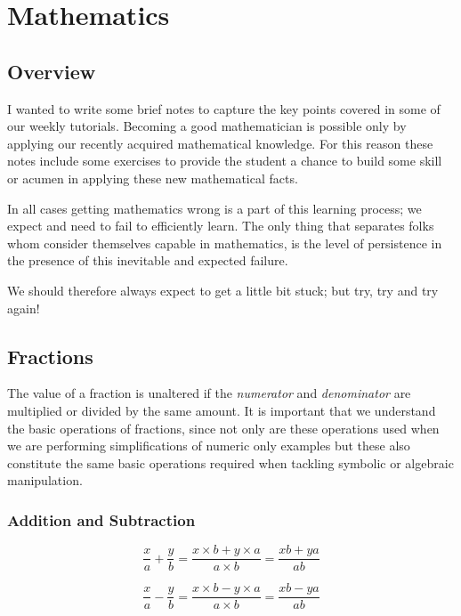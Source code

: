 \chapter{Mathematics}
\label{ch:intro}

\section{Overview}

I wanted to write some brief notes to capture the key points covered in some of our weekly tutorials. Becoming a good mathematician is possible only by applying our recently acquired mathematical knowledge. For this reason these notes include some exercises to provide the student a chance to build some skill or acumen in applying these new mathematical facts. 

In all cases getting mathematics wrong is a part of this learning process; we expect and need to fail to efficiently learn. The only thing that separates folks whom consider themselves capable in mathematics, is the level of persistence in the presence of this inevitable and expected failure. 

We should therefore always expect to get a little bit stuck; but try, try and try again!

\section{Fractions}

The value of a fraction is unaltered if the \textit{numerator} and \textit{denominator} are multiplied or divided by the same amount. It is important that we understand the basic operations of fractions, since not only are these operations used when we are performing simplifications of numeric only examples but these also constitute the same basic operations required when tackling symbolic or algebraic manipulation.

\subsection{Addition and Subtraction}

\begin{equation}
 \frac{x}{a} + \frac{y}{b} = \frac{x \times b + y \times a}{a \times b} = \frac{xb + ya}{ab}
\end{equation}

\begin{equation}
 \frac{x}{a} - \frac{y}{b} = \frac{x \times b - y \times a}{a \times b} = \frac{xb - ya}{ab}
\end{equation}

